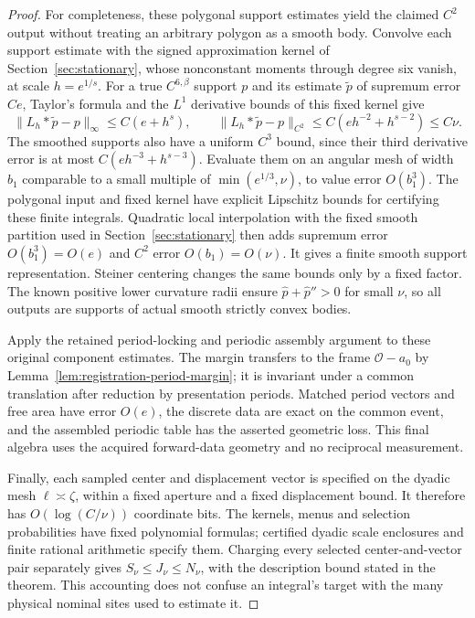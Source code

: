 \begin{proof}
For completeness, these polygonal support estimates yield the claimed
$C^2$ output without treating an arbitrary polygon as a smooth body.
Convolve each support estimate with the signed approximation kernel
of Section~\ref{sec:stationary}, whose nonconstant moments through
degree six vanish, at scale $h=e^{1/s}$.  For a true $C^{6,\beta}$
support $p$ and its estimate $\widetilde p$ of supremum error $Ce$,
Taylor's formula and the $L^1$ derivative bounds of this fixed kernel
give
\[
 \|L_h*\widetilde p-p\|_\infty\le C(e+h^s),\qquad
 \|L_h*\widetilde p-p\|_{C^2}
                         \le C(eh^{-2}+h^{s-2})\le C\nu.
\]
The smoothed supports also have a uniform $C^3$ bound, since their
third derivative error is at most $C(eh^{-3}+h^{s-3})$.  Evaluate them
on an angular mesh of width $b_1$ comparable to a small multiple of
$\min(e^{1/3},\nu)$, to value error $O(b_1^3)$.  The polygonal
input and fixed kernel have explicit Lipschitz bounds for certifying
these finite integrals.  Quadratic local interpolation with the fixed
smooth partition used in Section~\ref{sec:stationary} then adds
supremum error $O(b_1^3)=O(e)$ and $C^2$ error $O(b_1)=O(\nu)$.
It gives a finite smooth support representation.  Steiner centering
changes the same bounds only by a fixed factor.  The known positive lower curvature
radii ensure $\widehat p+\widehat p''>0$ for small $\nu$, so all
outputs are supports of actual smooth strictly convex bodies.

Apply the retained period-locking and periodic assembly argument to
these original component estimates.  The margin transfers to the
frame $\mathcal O-a_0$ by
Lemma~\ref{lem:registration-period-margin}; it is invariant under a
common translation after reduction by presentation periods.  Matched
period vectors and free area have error $O(e)$, the discrete data
are exact on the common event, and the assembled periodic table has
the asserted geometric loss.  This final algebra uses the acquired
forward-data geometry and no reciprocal measurement.

Finally, each sampled center and displacement vector is specified on
the dyadic mesh $\ell\asymp\zeta$, within a fixed aperture and a
fixed displacement bound.  It therefore has
$O(\log(C/\nu))$ coordinate bits.  The kernels, menus and selection
probabilities have fixed polynomial formulas; certified dyadic scale
enclosures and finite rational arithmetic specify them.  Charging
every selected center-and-vector pair separately gives
$S_\nu\le J_\nu\le N_\nu$, with the description bound stated in
the theorem.  This accounting does not confuse an integral's target
with the many physical nominal sites used to estimate it.
\end{proof}

